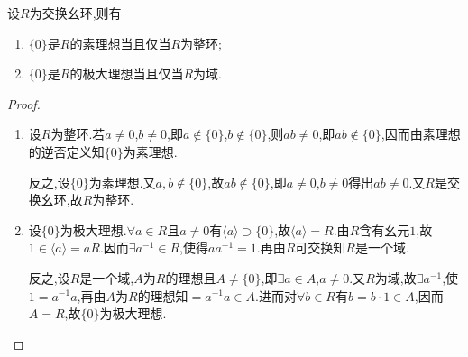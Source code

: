 \documentclass[../../main.tex]{subfiles}%
\begin{document}
\begin{lemma}\label{lemma:抽象代数--引理2.8.1}
设$R$为交换幺环,则有
\begin{enumerate}[(1)]
\item\label{lemma:抽象代数--引理2.8.1-1} $\{0\}$是$R$的素理想当且仅当$R$为整环;

\item\label{lemma:抽象代数--引理2.8.1-2} $\{0\}$是$R$的极大理想当且仅当$R$为域.
\end{enumerate}
\end{lemma}
\begin{proof}
\begin{enumerate}[(1)]
\item 设$R$为整环.若$a \neq 0$,$b \neq 0$,即$a \notin \{0\}$,$b \notin \{0\}$,则$ab \neq 0$,即$ab \notin \{0\}$,因而由素理想的逆否定义知$\{0\}$为素理想.

反之,设$\{0\}$为素理想.又$a,b \notin \{0\}$,故$ab \notin \{0\}$,即$a \neq 0$,$b \neq 0$得出$ab \neq 0$.又$R$是交换幺环,故$R$为整环.

\item 设$\{0\}$为极大理想.$\forall a \in R$且$a \neq 0$有$\langle a \rangle \supset \{0\}$,故$\langle a \rangle = R$.由$R$含有幺元$1$,故$1 \in \langle a \rangle = aR$.因而$\exists a^{-1} \in R$,使得$aa^{-1} = 1$.再由$R$可交换知$R$是一个域.

反之,设$R$是一个域,$A$为$R$的理想且$A \neq \{0\}$,即$\exists a \in A$,$a \neq 0$.又$R$为域,故$\exists a^{-1}$,使$1 = a^{-1}a$,再由$A$为$R$的理想知$=a^{-1}a \in A$.进而对$\forall b \in R$有$b = b \cdot 1 \in A$,因而$A = R$,故$\{0\}$为极大理想.
\end{enumerate}

\end{proof}
\end{document}
